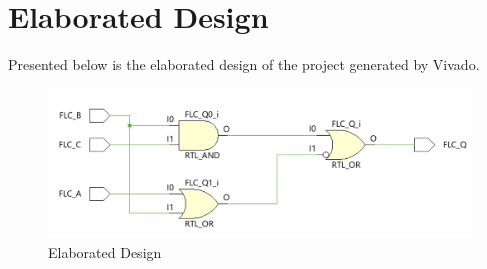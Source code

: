 \documentclass[12pt]{article}
\begin{document}
\section{Elaborated Design}

Presented below is the elaborated design of the project generated by Vivado.

\begin{figure}[h]
    \centering
    \includegraphics[width=.8\textwidth]{CPE 133 Lab 0 Elaborated Design.png}
    \caption{Elaborated Design}
    \label{fig:elaborateddesign}
\end{figure}
\end{document}
